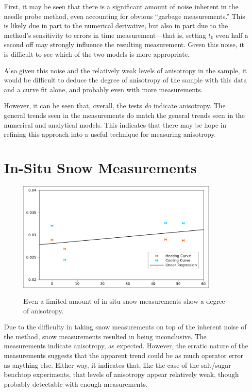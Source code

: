 First, it may be seen that there is a significant amount of noise inherent in
the needle probe method, even accounting for obvious ``garbage measurements.''
This is likely due in part to the numerical derivative, but also in part due to
the method's sensitivity to errors in time measurement---that is, setting \(t_0\)
even half a second off may strongly influence the resulting measurement. Given
this noise, it is difficult to see which of the two models is more appropriate.


Also given this noise and the relatively weak levels of anisotropy in the
sample, it would be difficult to deduce the degree of anisotropy of the sample
with this data and a curve fit alone, and probably even with more measurements.

However, it can be seen that, overall, the tests \emph{do} indicate anisotropy.
The general trends seen in the measurements do match the general trends seen in
the numerical and analytical models. This indicates that there may be hope in
refining this approach into a useful technique for measuring anisotropy.

\section{In-Situ Snow Measurements}

\begin{figure}[h]
\centering
\includegraphics[width=0.9\textwidth]{fig/snow_meas.png}
\label{fig:test_results}
\caption{Even a limited amount of in-situ snow measurements show a degree of
anisotropy.}
\end{figure}

Due to the difficulty in taking snow measurements on top of the inherent noise
of the method, snow measurements resulted in being inconclusive. The 
measurements indicate anisotropy, as expected. However, the erratic nature of
the measurements suggests that the apparent trend could be as much operator
error as anything else. Either way, it indicates that, like the case of the
salt/sugar benchtop experiments, that levels of anisotropy appear relatively
weak, though probably detectable with enough measurements.
